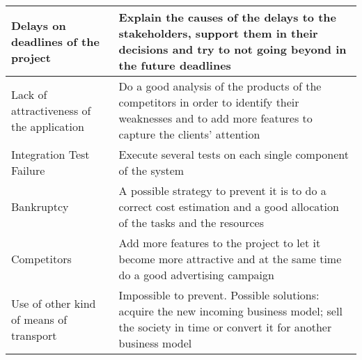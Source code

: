 \begin{longtable}{l|l}
\begin{minipage}[t]{0.5\textwidth}
Delays on deadlines of the project
\end{minipage} &
\begin{minipage}[t]{0.45\textwidth}
Explain the causes of the delays to the stakeholders, support them in their decisions and try to not going beyond in the  future deadlines
\end{minipage} \\ \hline
\begin{minipage}[t]{0.5\textwidth}
Lack of attractiveness of the application
\end{minipage} &
\begin{minipage}[t]{0.45\textwidth}
Do a good analysis of the products of the competitors in order to identify their weaknesses and to add more features to capture the clients’ attention
\end{minipage} \\ \hline
\begin{minipage}[t]{0.5\textwidth}
Integration Test Failure
\end{minipage} &
\begin{minipage}[t]{0.45\textwidth}
Execute several tests on each single component of the system
\end{minipage} \\ \hline
\begin{minipage}[t]{0.5\textwidth}
Bankruptcy
\end{minipage} &
\begin{minipage}[t]{0.45\textwidth}
A possible strategy to prevent it is to do a correct cost estimation and a good allocation of the tasks and the resources
\end{minipage} \\ \hline
\begin{minipage}[t]{0.5\textwidth}
Competitors
\end{minipage} &
\begin{minipage}[t]{0.45\textwidth}
Add more features to the project to let it become more attractive and at the same time do a good advertising campaign
\end{minipage} \\ \hline
\begin{minipage}[t]{0.5\textwidth}
Use of other kind of means of transport
\end{minipage} &
\begin{minipage}[t]{0.45\textwidth}
Impossible to prevent. Possible solutions: acquire the new incoming business model; sell the society in time or convert it for another business model

\end{minipage}
\end{longtable}
